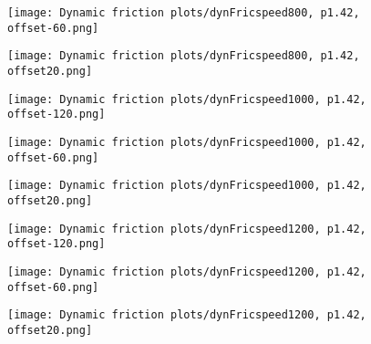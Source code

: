 \documentclass[12pt]{article}
\begin{document}
\clearpage
{}
\begin{figure}[!h]
    \centering
    \begin{minipage}{0.49\textwidth}       
         \texttt{[image: Dynamic friction plots/dynFricspeed800, p1.42, offset-60.png]}
    \end{minipage}
    \begin{minipage}{0.49\textwidth}       
         \texttt{[image: Dynamic friction plots/dynFricspeed800, p1.42, offset20.png]}
    \end{minipage}

\end{figure}

\begin{figure}[!h]
    \centering
    \begin{minipage}{0.49\textwidth}       
         \texttt{[image: Dynamic friction plots/dynFricspeed1000, p1.42, offset-120.png]}
    \end{minipage}
    \begin{minipage}{0.49\textwidth}       
         \texttt{[image: Dynamic friction plots/dynFricspeed1000, p1.42, offset-60.png]}
    \end{minipage}

\end{figure}
\begin{figure}[!h]
    \centering
    \begin{minipage}{0.49\textwidth}       
         \texttt{[image: Dynamic friction plots/dynFricspeed1000, p1.42, offset20.png]}
    \end{minipage}
    \begin{minipage}{0.49\textwidth}       
         \texttt{[image: Dynamic friction plots/dynFricspeed1200, p1.42, offset-120.png]}
    \end{minipage}

\end{figure}
\begin{figure}[!h]
    \centering
    \begin{minipage}{0.49\textwidth}       
         \texttt{[image: Dynamic friction plots/dynFricspeed1200, p1.42, offset-60.png]}
    \end{minipage}
    \begin{minipage}{0.49\textwidth}       
         \texttt{[image: Dynamic friction plots/dynFricspeed1200, p1.42, offset20.png]}
    \end{minipage}

\end{figure}
\end{document}
